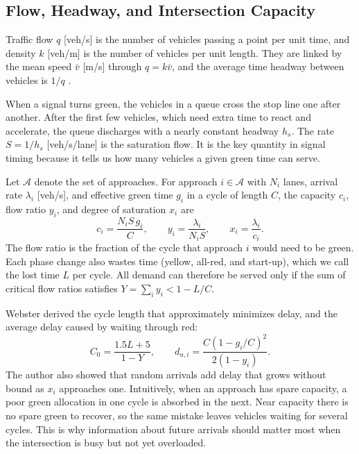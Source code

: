 \documentclass[letterpaper,12pt,conference]{ieeeconf}
\begin{document}
\subsection{Flow, Headway, and Intersection Capacity}

Traffic flow $q$ [veh/s] is the number of vehicles passing a
point per unit time, and density $k$ [veh/m] is the number of
vehicles per unit length. They are linked by the mean speed
$\bar v$ [m/s] through $q=k\bar v$, and the average time headway
between vehicles is $1/q$ \cite{treiber2013}.

When a signal turns green, the vehicles in a queue cross the stop
line one after another. After the first few vehicles, which need
extra time to react and accelerate, the queue discharges with a
nearly constant headway $h_s$. The rate $S=1/h_s$ [veh/s/lane] is
the saturation flow. It is the key quantity in signal timing
because it tells us how many vehicles a given green time can
serve.

Let $\mathcal{A}$ denote the set of approaches. For approach
$i\in\mathcal{A}$ with $N_i$ lanes, arrival rate $\lambda_i$
[veh/s], and effective green time $g_i$ in a cycle of length $C$,
the capacity $c_i$, flow ratio $y_i$, and degree of saturation
$x_i$ are
\begin{equation}
c_i=\frac{N_i S\, g_i}{C},\qquad
y_i=\frac{\lambda_i}{N_i S},\qquad
x_i=\frac{\lambda_i}{c_i}.
\label{eq:capacity}
\end{equation}
The flow ratio is the fraction of the cycle that approach $i$
would need to be green. Each phase change also wastes time
(yellow, all-red, and start-up), which we call the lost time $L$
per cycle. All demand can therefore be served only if the sum of
critical flow ratios satisfies $Y=\sum_i y_i<1-L/C$.

Webster \cite{webster1958} derived the cycle length that
approximately minimizes delay, and the average delay caused by
waiting through red:
\begin{equation}
C_0=\frac{1.5L+5}{1-Y},\qquad
d_{u,i}=\frac{C(1-g_i/C)^2}{2(1-y_i)}.
\label{eq:webster}
\end{equation}
The author also showed that random arrivals add delay that grows without
bound as $x_i$ approaches one. Intuitively, when an approach has
spare capacity, a poor green allocation in one cycle is absorbed
in the next. Near capacity there is no spare green to recover, so
the same mistake leaves vehicles waiting for several cycles. This
is why information about future arrivals should matter most when
the intersection is busy but not yet overloaded.
\end{document}
